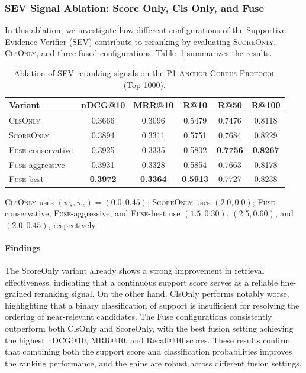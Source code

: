 \documentclass[preprint,12pt,a4paper]{elsarticle}
\begin{document}
\FloatBarrier
\subsubsection{SEV Signal Ablation: Score Only, Cls Only, and Fuse}
\label{subsec:sev_signal_ablation}
In this ablation, we investigate how different configurations of the Supportive Evidence Verifier (SEV) contribute to reranking by evaluating \textsc{ScoreOnly}, \textsc{ClsOnly}, and three fused configurations. Table~\ref{tab:sev_ablation_top1000} summarizes the results.

\begin{table}[H]
  \centering
  \caption{Ablation of SEV reranking signals on the \textsc{P1-Anchor Corpus Protocol} (Top-1000).}
  \label{tab:sev_ablation_top1000}
  \small
  \setlength{\tabcolsep}{4pt}
  \begin{tabular}{lccccc}
    \toprule
    \textbf{Variant} & \textbf{nDCG@10} & \textbf{MRR@10} & \textbf{R@10} & \textbf{R@50} & \textbf{R@100} \\
    \midrule
    \textsc{ClsOnly} & 0.3666 & 0.3096 & 0.5479 & 0.7476 & 0.8118 \\
    \textsc{ScoreOnly} & 0.3894 & 0.3311 & 0.5751 & 0.7684 & 0.8229 \\
    \textsc{Fuse}-conservative & 0.3925 & 0.3335 & 0.5802 & \textbf{0.7756} & \textbf{0.8267} \\
    \textsc{Fuse}-aggressive & 0.3931 & 0.3328 & 0.5854 & 0.7663 & 0.8178 \\
    \textsc{Fuse}-best & \textbf{0.3972} & \textbf{0.3364} & \textbf{0.5913} & 0.7727 & 0.8238 \\
    \bottomrule
  \end{tabular}

  \vspace{2pt}
  {\footnotesize
  \textsc{ClsOnly} uses $(w_s,w_c)=(0.0,0.45)$; \textsc{ScoreOnly} uses $(2.0,0.0)$; \textsc{Fuse}-conservative, \textsc{Fuse}-aggressive, and \textsc{Fuse}-best use $(1.5,0.30)$, $(2.5,0.60)$, and $(2.0,0.45)$, respectively.\par}
\end{table}

\paragraph{Findings}
The ScoreOnly variant already shows a strong improvement in retrieval effectiveness, indicating that a continuous support score serves as a reliable fine-grained reranking signal. On the other hand, ClsOnly performs notably worse, highlighting that a binary classification of support is insufficient for resolving the ordering of near-relevant candidates. The Fuse configurations consistently outperform both ClsOnly and ScoreOnly, with the best fusion setting achieving the highest nDCG@10, MRR@10, and Recall@10 scores. These results confirm that combining both the support score and classification probabilities improves the ranking performance, and the gains are robust across different fusion settings.
\end{document}
